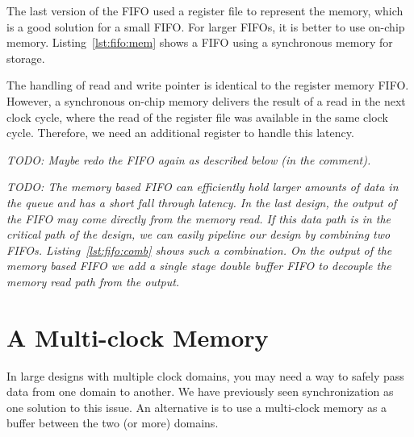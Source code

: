 \documentclass[%
    10pt,
    headinclude, footinclude=false,
    openright, %
    notitlepage,
    cleardoublepage=empty,
    headsepline,
    numbers=noenddot,
    bibliography=totoc, index=totoc,
    ]{scrbook}
\newcommand{\code}[1]{{\lstinline[basicstyle=\small\ttfamily]{#1}}}
\newcommand{\todo}[1]{{\emph{TODO: #1}}}
\begin{document}
The last version of the FIFO used a register file to represent the memory,
which is a good solution for a small FIFO. For larger FIFOs, it is better to
use on-chip memory.
Listing~\ref{lst:fifo:mem} shows a FIFO using a synchronous memory for
storage.

\newpage
{}

The handling of read and write pointer is identical to the register memory
FIFO. However, a synchronous on-chip memory delivers the result of a read
in the next clock cycle, where the read of the register file was available in the
same clock cycle.
Therefore, we need an additional register to handle this latency.

\todo{Maybe redo the FIFO again as described below (in the comment).}

\todo{
The memory based FIFO can efficiently hold larger amounts of data in the queue
and has a short fall through latency. In the last design, the output of the FIFO may
come directly from the memory read. If this data path is in the critical path of the design,
we can easily pipeline our design by combining two FIFOs. Listing~\ref{lst:fifo:comb}
shows such a combination. On the output of the memory based FIFO we add a single
stage double buffer FIFO to decouple the memory read path from the output.}


\section{A Multi-clock Memory}

In large designs with multiple clock domains, you may need a way to safely
pass data from one domain to another. We have previously seen synchronization as
one solution to this issue. An alternative is to use a multi-clock memory as
a buffer between the two (or more) domains.
\end{document}
